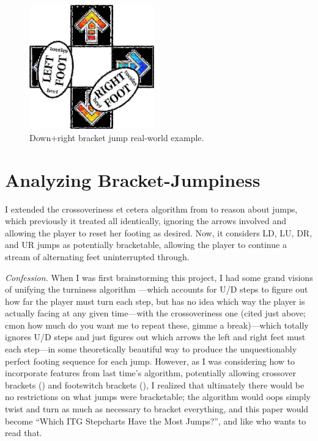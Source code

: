 \documentclass[10pt]{sigplanconf}
\begin{document}
\begin{figure}[h]
	\begin{center}
		\includegraphics[width=0.48\textwidth]{how-2-bracket.jpg}
	\end{center}
	\caption{Down+right bracket jump real-world example.}
	\label{fig:how-2-bracket}
\end{figure}


\section{Analyzing Bracket-Jumpiness}
\label{sec:analyzing}

I extended the crossoveriness et cetera algorithm from \cite{crossoveriness} to reason about jumps,
which previously it treated all identically,
ignoring the arrows involved and allowing the player to reset her footing as desired.
Now, it considers LD, LU, DR, and UR jumps as potentially bracketable,
allowing the player to continue a stream of alternating feet uninterrupted through.

\textit{Confession.}
When I was first brainstorming this project,
I had some grand visions of unifying the turniness algorithm \cite{turniness}---which
accounts for U/D steps to figure out how far the player must turn each step,
but has no idea which way the player is actually facing at any given time---with
the crossoveriness one
(cited just above; cmon how much do you want me to repeat these, gimme a break)---which
totally ignores U/D steps and just figures out which arrows the left and right feet must each step---in
some theoretically beautiful way to produce the unquestionably perfect footing sequence for each jump.
%
However, as I was considering how to incorporate features from last time's algorithm,
potentially allowing crossover brackets ()
and footswitch brackets (),
I realized that ultimately there would be no restrictions on what jumps were bracketable;
the algorithm would oops simply twist and turn as much as necessary to bracket everything,
and this paper would become ``Which ITG Stepcharts Have the Most Jumps?'', and like who wants to read that.
\end{document}

